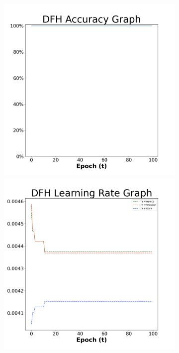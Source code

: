 \begin{figure}[H]
    \centering %
\begin{subfigure}{0.3\textwidth}
  \includegraphics[width=\linewidth]{images/exper1/iris/DFH_0.01_acc.png}
    \includegraphics[width=\linewidth]{images/exper1/iris/DFH_0.01_lr.png}

\end{subfigure}
\end{figure}

